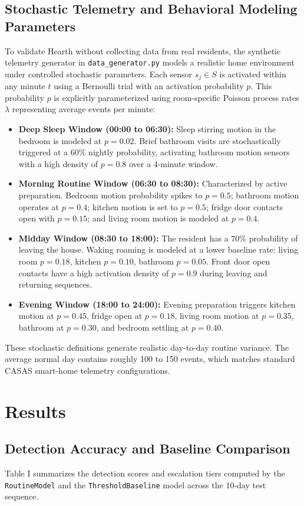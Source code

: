 \documentclass[conference]{IEEEtran}
\begin{document}
\subsection{Stochastic Telemetry and Behavioral Modeling Parameters}
To validate Hearth without collecting data from real residents, the synthetic telemetry generator in \texttt{data\_generator.py} models a realistic home environment under controlled stochastic parameters. Each sensor $s_j \in S$ is activated within any minute $t$ using a Bernoulli trial with an activation probability $p$. This probability $p$ is explicitly parameterized using room-specific Poisson process rates $\lambda$ representing average events per minute:
\begin{itemize}
  \item \textbf{Deep Sleep Window (00:00 to 06:30):} Sleep stirring motion in the bedroom is modeled at $p = 0.02$. Brief bathroom visits are stochastically triggered at a $60\%$ nightly probability, activating bathroom motion sensors with a high density of $p = 0.8$ over a 4-minute window.
  \item \textbf{Morning Routine Window (06:30 to 08:30):} Characterized by active preparation. Bedroom motion probability spikes to $p = 0.5$; bathroom motion operates at $p = 0.4$; kitchen motion is set to $p = 0.5$; fridge door contacts open with $p = 0.15$; and living room motion is modeled at $p = 0.4$.
  \item \textbf{Midday Window (08:30 to 18:00):} The resident has a $70\%$ probability of leaving the house. Waking roaming is modeled at a lower baseline rate: living room $p = 0.18$, kitchen $p = 0.10$, bathroom $p = 0.05$. Front door open contacts have a high activation density of $p = 0.9$ during leaving and returning sequences.
  \item \textbf{Evening Window (18:00 to 24:00):} Evening preparation triggers kitchen motion at $p = 0.45$, fridge open at $p = 0.18$, living room motion at $p = 0.35$, bathroom at $p = 0.30$, and bedroom settling at $p = 0.40$.
\end{itemize}
These stochastic definitions generate realistic day-to-day routine variance. The average normal day contains roughly 100 to 150 events, which matches standard CASAS smart-home telemetry configurations.

\section{Results}

\subsection{Detection Accuracy and Baseline Comparison}
Table I summarizes the detection scores and escalation tiers computed by the \texttt{RoutineModel} and the \texttt{ThresholdBaseline} model across the 10-day test sequence.
\end{document}
